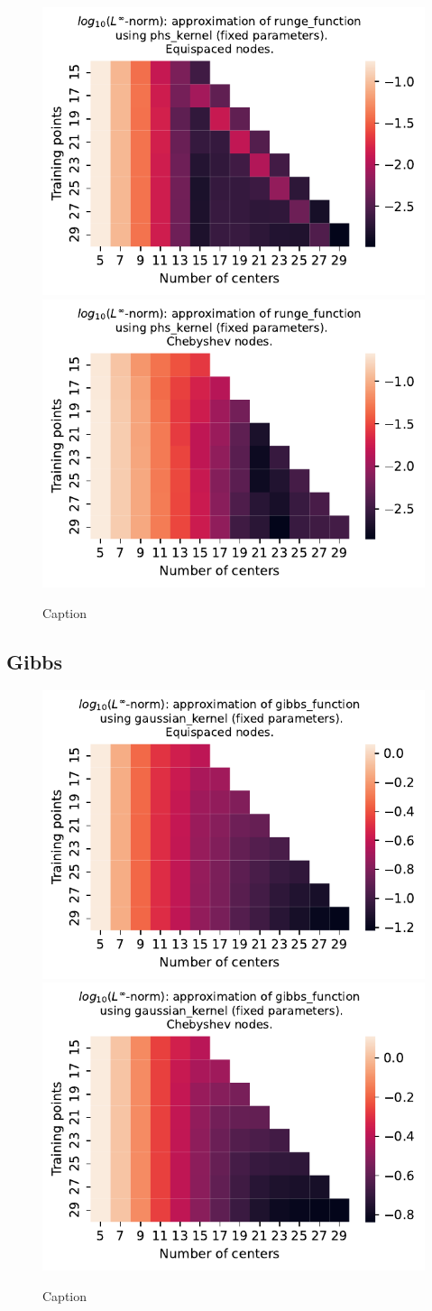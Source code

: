 \documentclass[12pt]{report} %
\begin{document}
\begin{figure}[ht]
    \centering
    
    \includegraphics[width=.49\textwidth]{imagenes/experiments/1d/least_squares/opt-runge_function-Kphs_kernel-Equi.pdf}
    \includegraphics[width=.49\textwidth]{imagenes/experiments/1d/least_squares/opt-runge_function-Kphs_kernel-Cheb.pdf}
    \caption{Caption}
    \label{fig:opt-runge-phs}
\end{figure}


\subsection*{Gibbs}

\begin{figure}[ht]
    \centering
    
    \includegraphics[width=.49\textwidth]{imagenes/experiments/1d/least_squares/opt-gibbs_function-Kgaussian_kernel-Equi.pdf}
    \includegraphics[width=.49\textwidth]{imagenes/experiments/1d/least_squares/opt-gibbs_function-Kgaussian_kernel-Cheb.pdf}
    \caption{Caption}
    \label{fig:opt-gibbs-gaussian}
\end{figure}
\end{document}
